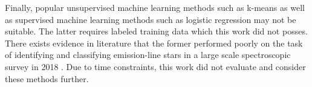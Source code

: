 Finally, popular unsupervised machine learning methods such as k-means as well as supervised machine learning methods such as logistic regression may not be suitable. The latter requires labeled training data which this work did not posses. There exists evidence in literature that the former performed poorly on the task of identifying and classifying emission-line stars in a large scale spectroscopic survey in 2018 \citep{garcia2018machine}. Due to time constraints, this work did not evaluate and consider these methods further.

